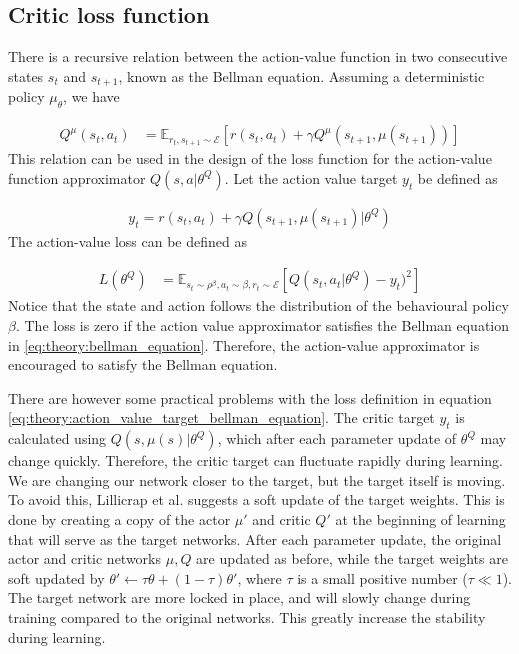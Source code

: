 \documentclass[class=book, crop=false]{standalone}
\begin{document}
\subsection{Critic loss function}
There is a recursive relation between the action-value function in two consecutive states $s_{t}$ and $s_{t+1}$, known as the Bellman equation. Assuming a deterministic policy $\mu_{\theta}$, we have

\begin{equation}
   \begin{aligned}\label{eq:theory:bellman_equation}
Q^{\mu}(s_{t},a_{t}) 
&= \mathbb{E}_{r_{t},s_{t+1} \sim \mathcal{E}}
[r(s_{t},a_{t}) +\gamma Q^{\mu}(s_{t+1},\mu(s_{t+1}))]
\end{aligned} 
\end{equation}
This relation can be used in the design of the loss function for the action-value function approximator $Q(s,a|\theta^{Q})$. Let the action value target $y_{t} $ be defined as 

\begin{equation}
   \begin{aligned}\label{eq:theory:action_value_target_bellman_equation}
y_{t} = r(s_{t},a_{t}) + \gamma Q(s_{t+1},\mu(s_{t+1})|\theta^{Q})
\end{aligned} 
\end{equation}
The action-value loss can be defined as 

\begin{equation}
   \begin{aligned}\label{eq:theory:action_value_loss_bellman_equation}
L(\theta^{Q}) 
&= \mathbb{E}_
{s_{t}\sim\rho^{\beta},a_{t} \sim \beta, r_{t} \sim \mathcal{E}}
[Q(s_{t},a_{t}|\theta^{Q})- y_{t})^{2}]
\end{aligned} 
\end{equation}
Notice that the state and action follows the distribution of the behavioural policy $\beta$. The loss is zero if the action value approximator satisfies the Bellman equation in \eqref{eq:theory:bellman_equation}. Therefore, the action-value approximator is encouraged to satisfy the Bellman equation.

There are however some practical problems with the loss definition in equation \eqref{eq:theory:action_value_target_bellman_equation}. The critic target $y_{t}$ is calculated using $Q(s,\mu(s)|\theta^{Q})$, which after each parameter update of $\theta^{Q}$ may change quickly. Therefore, the critic target can fluctuate rapidly during learning. We are changing our network closer to the target, but the target itself is moving. To avoid this, Lillicrap et al. suggests a soft update of the target weights\cite{DBLP:journals/corr/LillicrapHPHETS15}. This is done by creating a copy of the actor $\mu'$ and critic $Q'$ at the beginning of learning that will serve as the target networks. After each parameter update, the original actor and critic networks $\mu,Q$ are updated as before, while the target weights are soft updated by $\theta' \leftarrow \tau\theta + (1-\tau)\theta'$, where $\tau$ is a small positive number ($\tau  \ll 1$). The target network are more locked in place, and will slowly change during training compared to the original networks. This greatly increase the stability during learning. 
\end{document}
